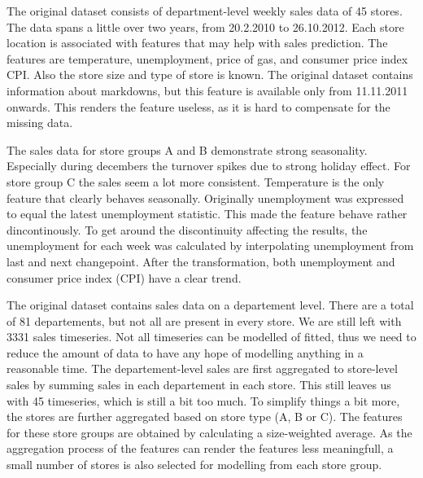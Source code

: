 \documentclass[english, 12pt, a4paper, sci, utf8, a-1b, online]{aaltothesis}
\begin{document}

The original dataset consists of department-level weekly sales data of 45 stores. The data spans a little over two years, from 
20.2.2010 to 26.10.2012. Each store location is associated with features that may help with sales prediction. 
The features are temperature, unemployment, price of gas, and consumer price index CPI. Also the store size
and type of store is known. The original dataset contains information about markdowns, but this feature is available only from 11.11.2011 onwards.
This renders the feature useless, as it is hard to compensate for the missing data.

The sales data for store groups A and B demonstrate strong seasonality. Especially during decembers the turnover spikes due to 
strong holiday effect. For store group C the sales seem a lot more consistent. Temperature is the only feature that clearly behaves seasonally. 
Originally unemployment was expressed to equal the latest unemployment statistic. This made the feature behave rather dincontinously. To get around
the discontinuity affecting the results, the unemployment for each week was calculated by interpolating unemployment from last and next changepoint.
After the transformation, both unemployment and consumer price index (CPI) have a clear trend. 



The original dataset contains sales data on a departement level. There are a total of 81 departements, but not all are present in every
store. We are still left with 3331 sales timeseries. Not all timeseries can be modelled of fitted, thus we need to reduce the amount of data to have any
hope of modelling anything in a reasonable time. The departement-level sales are first aggregated to store-level sales by summing sales in each departement
in each store. This still leaves us with 45 timeseries, which is still a bit too much. To simplify things a bit more, the stores are further aggregated based on
store type (A, B or C). The features for these store groups are obtained by calculating a size-weighted average. As the aggregation process of the features can 
render the features less meaningfull, a small number of stores is also selected for modelling from each store group.
\end{document}
